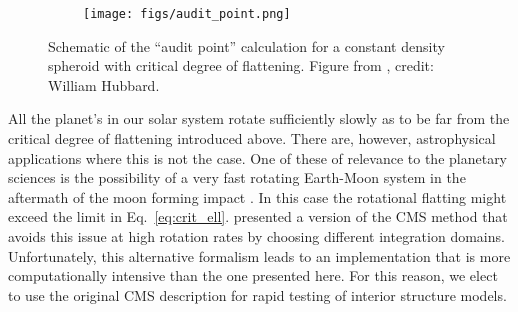 \begin{figure}[h!]  
  \centering
    \texttt{[image: figs/audit\_point.png]}
\caption{ Schematic of the ``audit point'' calculation for a constant density
    spheroid with critical degree of flattening. Figure from \citet{Hubbard2014},
credit: William Hubbard.}
\label{fig:audit_point}
\end{figure}

All the planet's in our solar system rotate sufficiently slowly as to be far from the
critical degree of flattening introduced above. There are, however, astrophysical
applications where this is not the case. One of these of relevance to the planetary
sciences is the possibility of a very fast rotating Earth-Moon system in the
aftermath of the moon forming impact \cite{Cuk2012}. In this case the rotational
flatting might exceed the limit in Eq.~\ref{eq:crit_ell}. \citet{Kong2013} presented
a version of the CMS method that avoids this issue at high rotation rates by choosing
different integration domains. Unfortunately, this alternative formalism leads to an
implementation that is more computationally intensive than the one presented here.
For this reason, we elect to use the original CMS description for rapid testing of
interior structure models.




